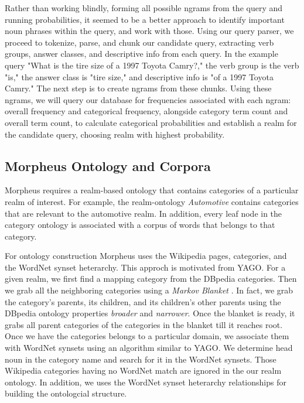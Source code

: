 Rather than working blindly, forming all possible ngrams from the query 
and running probabilities, it seemed to be a better approach to identify 
important noun phrases within the query, and work with those. Using our 
query parser, we proceed to tokenize, parse, and chunk our candidate query, 
extracting verb groups, answer classes, and descriptive info from each query. 
In the example query "What is the tire size of a 1997 Toyota Camry?," 
the verb group is the verb "is," the answer class is "tire size," and descriptive 
info is "of a 1997 Toyota Camry." The next step is to create ngrams from these chunks. 
Using these ngrams, we will query our database for frequencies associated with 
each ngram: overall frequency and categorical frequency, alongside category 
term count and overall term count, to calculate categorical probabilities 
and establish a realm for the candidate query, choosing realm with highest probability.


\subsection{Morpheus Ontology and Corpora} 
\label{sec:ontology_corpora}

Morpheus requires a realm-based ontology that contains categories of a
particular realm of interest. For example, the realm-ontology \textit{Automotive}
contains categories that are relevant to the automotive realm. In
addition, every leaf node in the category ontology is associated with a corpus of words
that belongs to that category. 

For ontology construction Morpheus uses the Wikipedia pages, categories,
and the WordNet synset heterarchy. This approch is motivated from
YAGO\cite{Suchanek2009phd}. For a given realm, we first find a mapping category 
from the DBpedia categories\cite{Bizer2009}. Then we grab all the neighboring 
categories using a \textit{Markov Blanket} \cite{PRIS}. In fact, we grab 
the category's parents, its children, and its 
children's other parents using the DBpedia ontology properties \textit{broader}
and \textit{narrower}. Once the blanket is ready, it grabs all parent categories
of the categories in the blanket till it reaches root. Once we have the
categories belongs to a particular domain, we associate them with WordNet synsets
using an algorithm similar to YAGO\cite{Suchanek2009phd}. We determine head noun in the
category name and search for it in the WordNet synsets.
Those Wikipedia categories having no WordNet match are ignored in the our realm
ontology. In addition, we uses the WordNet synset heterarchy relationships for building the ontologcial structure. 

